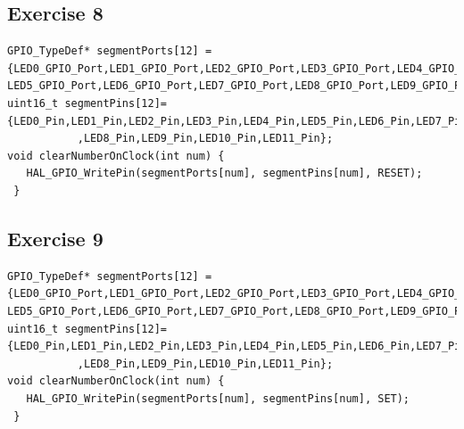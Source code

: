 \subsection{Exercise 8}
\begin{lstlisting}[caption=Ex8.c]
GPIO_TypeDef* segmentPorts[12] = {LED0_GPIO_Port,LED1_GPIO_Port,LED2_GPIO_Port,LED3_GPIO_Port,LED4_GPIO_Port,
LED5_GPIO_Port,LED6_GPIO_Port,LED7_GPIO_Port,LED8_GPIO_Port,LED9_GPIO_Port,LED10_GPIO_Port,LED11_GPIO_Port};
uint16_t segmentPins[12]={LED0_Pin,LED1_Pin,LED2_Pin,LED3_Pin,LED4_Pin,LED5_Pin,LED6_Pin,LED7_Pin
      	   ,LED8_Pin,LED9_Pin,LED10_Pin,LED11_Pin};
void clearNumberOnClock(int num) {
   HAL_GPIO_WritePin(segmentPorts[num], segmentPins[num], RESET);
 }

\end{lstlisting}


\subsection{Exercise 9}
\begin{lstlisting}[caption=Ex9.c]
GPIO_TypeDef* segmentPorts[12] = {LED0_GPIO_Port,LED1_GPIO_Port,LED2_GPIO_Port,LED3_GPIO_Port,LED4_GPIO_Port,
LED5_GPIO_Port,LED6_GPIO_Port,LED7_GPIO_Port,LED8_GPIO_Port,LED9_GPIO_Port,LED10_GPIO_Port,LED11_GPIO_Port};
uint16_t segmentPins[12]={LED0_Pin,LED1_Pin,LED2_Pin,LED3_Pin,LED4_Pin,LED5_Pin,LED6_Pin,LED7_Pin
      	   ,LED8_Pin,LED9_Pin,LED10_Pin,LED11_Pin};
void clearNumberOnClock(int num) {
   HAL_GPIO_WritePin(segmentPorts[num], segmentPins[num], SET);
 }

\end{lstlisting}

